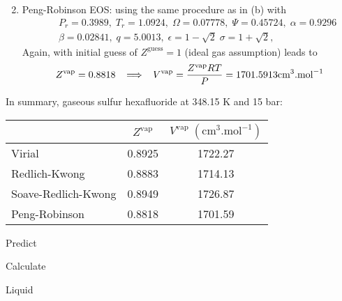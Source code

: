 \begin{probsol}
\begin{enumerate}[1.]
\begin{displaymath}
                   \end{displaymath}
%
        \item Peng-Robinson EOS: using the same procedure as in (b) with 
                   \begin{eqnarray}
                      && P_{r} = 0.3989,\; T_{r}=1.0924,\; \Omega=0.07778,\; \Psi = 0.45724,\; \alpha=0.9296 \nonumber  \\
                      && \beta = 0.02841,\; q=5.0013,\; \epsilon = 1 - \sqrt{2}\; \sigma = 1 + \sqrt{2}, \nonumber 
                   \end{eqnarray}
                   Again, with initial guess of $Z^{\text{guess}}=1$ (ideal gas assumption) leads to 
                   \begin{displaymath}
                      Z^{\text{vap}} = 0.8818 \;\;\;\Longrightarrow \;\;\; V^{\text{vap}} = \displaystyle\frac{Z^{\text{vap}} R T}{P} = 1701.5913 \text{cm}^{3}\text{.mol}^{-1}
                   \end{displaymath}
%
     \end{enumerate}
     In summary, gaseous sulfur hexafluoride at 348.15 K and 15 bar:
     \begin{center}
        \begin{tabular} {l| c c }
           \hline
                               &  $Z^{\text{vap}}$    & $V^{\text{vap}}\;\left(\text{cm}^{3}\text{.mol}^{-1}\right)$    \\
           \hline
           Virial              &  0.8925           & 1722.27                                                    \\
           Redlich-Kwong       &  0.8883           & 1714.13                                                    \\
           Soave-Redlich-Kwong &  0.8949           & 1726.87                                                    \\
           Peng-Robinson       &  0.8818           & 1701.59                                                    \\
           \hline   
        \end{tabular}
     \end{center}


  \end{probsol}
%
  \begin{probsol}\label{Chapter:VolumetricPropertiesPureSubstances:Problem:02:solution}
     Predict 
  \end{probsol}
%
  \begin{probsol}\label{Chapter:VolumetricPropertiesPureSubstances:Problem:03:solution}
     Calculate
  \end{probsol}
%
  \begin{probsol}\label{Chapter:VolumetricPropertiesPureSubstances:Problem:04:solution} 
     Liquid 
  \end{probsol}
%
